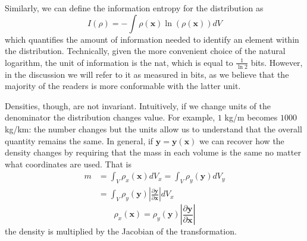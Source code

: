\documentclass[smallextended]{svjour3}
\numberwithin{equation}{section}
\theoremstyle{definition}
\begin{document}
Similarly, we can define the information entropy for the distribution as
\begin{equation}
I(\rho) =-\int \rho(\mathbf{x}) \ln (\rho(\mathbf{x})) dV
\end{equation}
which quantifies the amount of information needed to identify an element within the distribution. Technically, given the more convenient choice of the natural logarithm, the unit of information is the nat, which is equal to $\frac{1}{\ln 2}$ bits. However, in the discussion we will refer to it as measured in bits, as we believe that the majority of the readers is more conformable with the latter unit.

Densities, though, are not invariant. Intuitively, if we change units of the denominator the distribution changes value. For example, $1$ kg/m becomes $1000$ kg/km: the number changes but the units allow us to understand that the overall quantity remains the same. In general, if $\mathbf{y}=\mathbf{y}(\mathbf{x})$ we can recover how the density changes by requiring that the mass in each volume is the same no matter what coordinates are used. That is
\begin{align*}
m &=\int_V \rho_x(\mathbf{x}) dV_x = \int_V \rho_y(\mathbf{y}) dV_y \\
&=\int_V\rho_y(\mathbf{y}) \left|\frac{\partial \mathbf{y}}{\partial \mathbf{x}}\right| dV_x
\end{align*}
\begin{equation}\label{density_transformation}
\rho_x(\mathbf{x}) = \rho_y(\mathbf{y}) \left|\frac{\partial \mathbf{y}}{\partial \mathbf{x}}\right|
\end{equation}
the density is multiplied by the Jacobian of the transformation.
\end{document}
